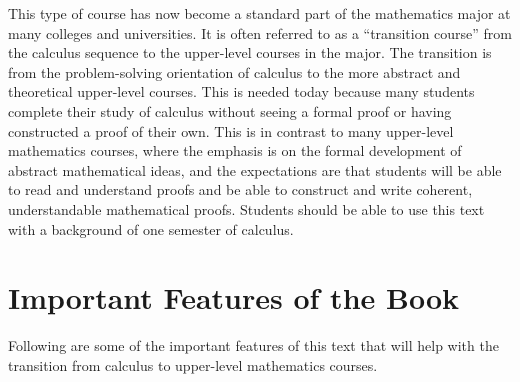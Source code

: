 This type of course has now become a standard part of the mathematics major at many colleges and universities.  It is often referred to as a ``transition course'' from the calculus sequence to the upper-level courses in the major.  The transition is from the problem-solving orientation of calculus to the more abstract and theoretical upper-level courses.  This is needed today because %
many students complete their study of calculus without seeing a formal proof or having constructed a proof of their own.  This is in contrast to many upper-level mathematics courses, where the emphasis is on the formal development of abstract mathematical ideas, and the expectations are that students will be able to read and  understand proofs and be able to construct and write coherent, understandable mathematical proofs.  Students should be able to use this text with a background of one semester of calculus.

\section*{Important Features of the Book}
Following are some of the important features of this text that will help with the transition from calculus to upper-level mathematics courses.

